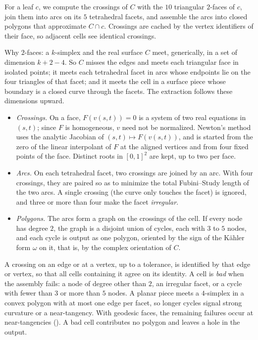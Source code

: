 \documentclass[11pt]{article}
\theoremstyle{plain}
\theoremstyle{definition}
\theoremstyle{remark}
\begin{document}
For a leaf $c$, we compute the crossings of $C$ with the $10$ triangular
$2$-faces of $c$, join them into arcs on its $5$ tetrahedral facets, and
assemble the arcs into closed polygons that approximate $C\cap c$.
Crossings are cached by the vertex identifiers of their face, so adjacent
cells see identical crossings.

Why $2$-faces: a $k$-simplex and the real surface $C$ meet, generically,
in a set of dimension $k+2-4$. So $C$ misses the edges and meets each
triangular face in isolated points; it meets each tetrahedral facet in
arcs whose endpoints lie on the four triangles of that facet; and it
meets the cell in a surface piece whose boundary is a closed curve
through the facets. The extraction follows these dimensions upward.
\begin{itemize}[itemsep=2pt]
\item \emph{Crossings.} On a face, $F(v(s,t))=0$ is a system of two real
  equations in $(s,t)$; since $F$ is homogeneous, $v$ need not be
  normalized. Newton's method uses the analytic Jacobian of
  $(s,t)\mapsto F(v(s,t))$, and is started from the zero of the linear
  interpolant of $F$ at the aligned vertices and from four fixed points
  of the face. Distinct roots in $[0,1]^2$ are kept, up to two per face.
\item \emph{Arcs.} On each tetrahedral facet, two crossings are joined by
  an arc. With four crossings, they are paired so as to minimize the
  total Fubini--Study length of the two arcs. A single crossing (the
  curve only touches the facet) is ignored, and three or more than four
  make the facet \emph{irregular}.
\item \emph{Polygons.} The arcs form a graph on the crossings of the cell.
  If every node has degree $2$, the graph is a disjoint union of cycles,
  each with $3$ to $5$ nodes, and each cycle is output as one polygon,
  oriented by the sign of the Kähler form $\omega$ on it, that is, by the complex orientation of $C$.
\end{itemize}
A crossing on an edge or at a vertex, up to a tolerance, is identified by
that edge or vertex, so that all cells containing it agree on its
identity. A cell is \emph{bad} when the assembly fails: a node of degree
other than $2$, an irregular facet, or a cycle with fewer than $3$ or
more than $5$ nodes. A planar piece meets a $4$-simplex in a convex
polygon with at most one edge per facet, so longer cycles signal strong
curvature or a near-tangency. With geodesic faces, the remaining failures
occur at near-tangencies (). A bad cell contributes no polygon and leaves a
hole in the output.
\end{document}
